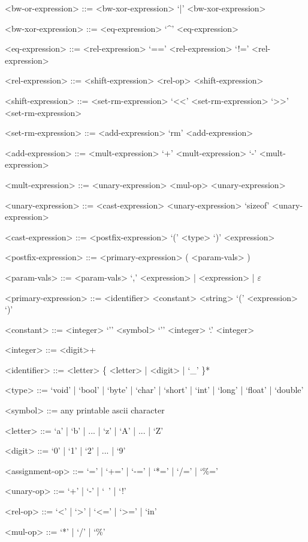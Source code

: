 \documentclass[
	article,			%
	11pt,				%
	oneside,			%
	a4paper,			%
	english,			%
	brazil,				%
	sumario=tradicional
	]{abntex2}
\begin{document}
\begin{grammar}
	<bw-or-expression> ::= <bw-xor-expression>
	\alt <bw-or-expression> `|' <bw-xor-expression>
	
	<bw-xor-expression> ::= <eq-expression>
	\alt <bw-xor-expression> `^' <eq-expression>
	
	<eq-expression> ::= <rel-expression>
	\alt <eq-expression> `==' <rel-expression>
	\alt <eq-expression> `!=' <rel-expression>
	
	<rel-expression> ::= <shift-expression>
	\alt <rel-expression> <rel-op> <shift-expression>
	
	<shift-expression> ::= <set-rm-expression>
	\alt <shift-expression> `<<' <set-rm-expression>
	\alt <shift-expression> `>>' <set-rm-expression>

	<set-rm-expression> ::= <add-expression>
	\alt <set-rm-expression> `rm' <add-expression>
	
	<add-expression> ::= <mult-expression>
	\alt <add-expression> `+' <mult-expression>
	\alt <add-expression> `-' <mult-expression>
	
	<mult-expression> ::= <unary-expression>
	\alt <mult-expression> <mul-op> <unary-expression>
	
	<unary-expression> ::= <cast-expression>
	\alt <unary-op> <unary-expression>
	\alt `sizeof' <unary-expression>

	<cast-expression> ::= <postfix-expression>
	\alt `(' <type> `)' <expression>
	
	<postfix-expression> ::= <primary-expression>
	\alt <postfix-expression> ( <param-vals> )
		
	<param-vals> ::= <param-vals> `,' <expression> | <expression> | $\varepsilon$

	<primary-expression> ::= <identifier>
	\alt <constant>
	\alt <string>
	\alt `(' <expression> `)'
	
	<constant> ::= <integer>
	\alt `'' <symbol> `''
	\alt <integer> `.' <integer>
	
	<integer> ::= <digit>+
	
	<identifier> ::= <letter> \{ <letter> | <digit> | `_' \}*

	<type> ::= `void' | `bool' | `byte' | `char' | `short' | `int' | `long' | `float' | `double'
	
	<symbol> ::= any printable ascii character

	<letter> ::= `a' | `b' | ... | `z' | `A' | ... | `Z'
	
	<digit> ::= `0' | `1' | `2' | ... | `9'
	
	<assignment-op> ::= `=' | `+=' | `-=' | `*=' | `/=' | `\%='
	
	<unary-op> ::= `+' | `-' | `~' | `!'
	
	<rel-op> ::= `<' | `>' | `<=' | `>=' | `in'
	
	<mul-op> ::= `*' | `/' | `\%'
	
\end{grammar}
\end{document}
